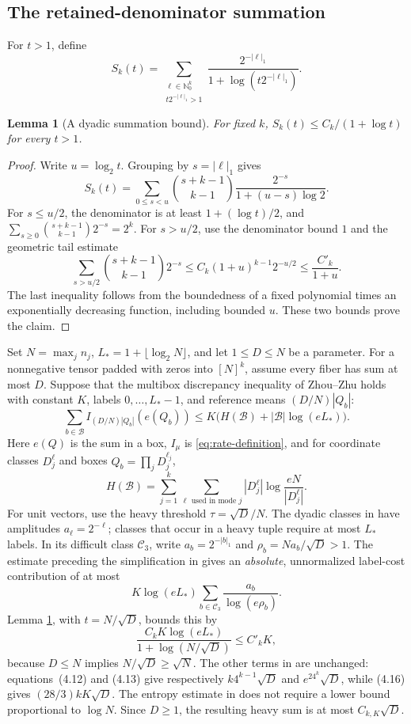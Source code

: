 \documentclass[11pt]{article}
\theoremstyle{spaced}
\newtheorem{lemma}[theorem]{Lemma}
\theoremstyle{remark}
\numberwithin{equation}{section}
\newcommand{\NN}{\mathbb N_0}
\begin{document}
\subsection{The retained-denominator summation}

For $t>1$, define
\[
 S_k(t)=\sum_{\substack{\ell\in\NN^k\\t2^{-|\ell|_1}>1}}
 \frac{2^{-|\ell|_1}}{1+\log(t2^{-|\ell|_1})}.
\]
\begin{lemma}[A dyadic summation bound]\label{lem:summation}
For fixed $k$, $S_k(t)\leq C_k/(1+\log t)$ for every $t>1$.
\end{lemma}
\begin{proof}
Write $u=\log_2 t$. Grouping by $s=|\ell|_1$ gives
\[
 S_k(t)=\sum_{0\leq s<u}
 \binom{s+k-1}{k-1}\frac{2^{-s}}{1+(u-s)\log2}.
\]
For $s\leq u/2$, the denominator is at least $1+(\log t)/2$, and
$\sum_{s\geq0}\binom{s+k-1}{k-1}2^{-s}=2^k$.
For $s>u/2$, use the denominator bound $1$ and the geometric tail estimate
\[
 \sum_{s>u/2}\binom{s+k-1}{k-1}2^{-s}
 \leq C_k(1+u)^{k-1}2^{-u/2}
 \leq \frac{C'_k}{1+u}.
\]
The last inequality follows from the boundedness of a fixed polynomial times an exponentially decreasing function, including bounded $u$. These two bounds prove the claim.
\end{proof}

Set $N=\max_j n_j$, $L_*=1+\lfloor\log_2 N\rfloor$, and let $1\leq D\leq N$ be a parameter. For a nonnegative tensor padded with zeros into $[N]^k$, assume every fiber has sum at most $D$. Suppose that the multibox discrepancy inequality of Zhou--Zhu \cite[Lemma~4.5]{ZZ} holds with constant $K$, labels $0,\ldots,L_*-1$, and reference means $(D/N)|Q_b|$:
\begin{equation}\label{eq:bernoulli-discrepancy}
 \sum_{b\in\mathcal B}I_{(D/N)|Q_b|}(e(Q_b))
 \leq K\bigl(H(\mathcal B)+|\mathcal B|\log(eL_*)\bigr).
\end{equation}
Here $e(Q)$ is the sum in a box, $I_\mu$ is
\eqref{eq:rate-definition}, and for coordinate classes $D_j^\ell$ and
boxes $Q_b=\prod_jD_j^{\ell_j}$,
\[
 H(\mathcal B)=\sum_{j=1}^k\sum_{\ell\text{ used in mode }j}
 |D_j^\ell|\log\frac{eN}{|D_j^\ell|}.
\]
For unit vectors, use the heavy threshold $\tau=\sqrt D/N$.
The dyadic classes in \cite[Proposition~4.6]{ZZ} have amplitudes
$a_\ell=2^{-\ell}$; classes that occur in a heavy tuple require at most
$L_*$ labels. In its difficult class $\mathcal C_3$, write
$a_b=2^{-|b|_1}$ and $\rho_b=Na_b/\sqrt D>1$.
The estimate preceding the simplification in
\cite[equations~(4.15)--(4.17)]{ZZ} gives an \emph{absolute},
unnormalized label-cost contribution of at most
\[
 K\log(eL_*)\sum_{b\in\mathcal C_3}\frac{a_b}{\log(e\rho_b)}.
\]
Lemma \ref{lem:summation}, with $t=N/\sqrt D$, bounds this by
\[
 \frac{C_k K\log(eL_*)}{1+\log(N/\sqrt D)}\leq C'_k K,
\]
because $D\leq N$ implies $N/\sqrt D\geq\sqrt N$. The other terms in \cite[proof of Proposition~4.6]{ZZ} are unchanged:
equations~(4.12) and (4.13) give respectively $k4^{k-1}\sqrt D$ and $e^24^k\sqrt D$, while (4.16) gives $(28/3)kK\sqrt D$. The entropy estimate in \cite[Appendix~A]{ZZ} does not require
a lower bound proportional to $\log N$. Since $D\geq1$, the resulting heavy sum is at most $C_{k,K}\sqrt D$.
\end{document}
